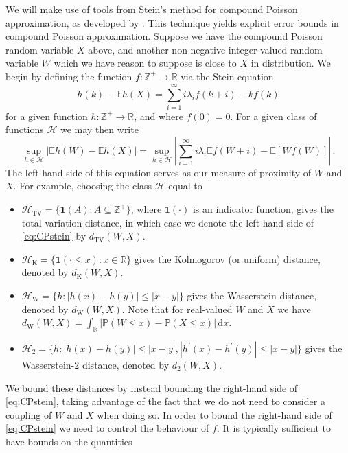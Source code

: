 \documentclass[12pt]{article}
\begin{document}
We will make use of tools from Stein's method for compound Poisson approximation, as developed by \cite{barbour92_paper}. This technique yields explicit error bounds in compound Poisson approximation. Suppose we have the compound Poisson random variable $X$ above, and another non-negative integer-valued random variable $W$ which we have reason to suppose is close to $X$ in distribution. We begin by defining the function $f:\mathbb{Z}^+\to\mathbb{R}$ via the Stein equation
\begin{equation}\label{eq:CPsteinop}
h(k)-\mathbb{E}h(X)=\sum_{i=1}^\infty i\lambda_if(k+i)-kf(k)
\end{equation}
for a given function $h:\mathbb{Z}^+\to\mathbb{R}$, and where $f(0)=0$. For a given class of functions $\mathcal{H}$ we may then write
\begin{equation}\label{eq:CPstein}
\sup_{h\in\mathcal{H}}|\mathbb{E}h(W)-\mathbb{E}h(X)|=\sup_{h\in\mathcal{H}}\left|\sum_{i=1}^\infty i\lambda_i\mathbb{E}f(W+i)-\mathbb{E}[Wf(W)]\right|\,.
\end{equation}
The left-hand side of this equation serves as our measure of proximity of $W$ and $X$. For example, choosing the class $\mathcal{H}$ equal to
\begin{itemize}
\item $\mathcal{H}_{\text{TV}}=\{\mathbf{1}(A):A\subseteq\mathbb{Z}^+\}$, where $\mathbf{1}(\cdot)$ is an indicator function, gives the total variation distance, in which case we denote the left-hand side of \eqref{eq:CPstein} by $d_\text{TV}(W,X)$.
\item $\mathcal{H}_{\text{K}}=\{\mathbf{1}(\cdot\leq x):x\in\mathbb{R}\}$ gives the Kolmogorov (or uniform) distance, denoted by $d_\text{K}(W,X)$.
\item $\mathcal{H}_{\text{W}}=\{h:|h(x)-h(y)|\leq|x-y|\}$ gives the Wasserstein distance, denoted by $d_\text{W}(W,X)$. Note that for real-valued $W$ and $X$ we have $d_\text{W}(W,X)=\int_\mathbb{R}|\mathbb{P}(W\leq x)-\mathbb{P}(X\leq x)|\,\text{d}x$.
\item $\mathcal{H}_2=\{h:|h(x)-h(y)|\leq|x-y|,|h^\prime(x)-h^\prime(y)|\leq|x-y|\}$ gives the Wasserstein-2 distance, denoted by $d_2(W,X)$.
\end{itemize}
We bound these distances by instead bounding the right-hand side of \eqref{eq:CPstein}, taking advantage of the fact that we do not need to consider a coupling of $W$ and $X$ when doing so. In order to bound the right-hand side of \eqref{eq:CPstein} we need to control the behaviour of $f$. It is typically sufficient to have bounds on the quantities
\end{document}
